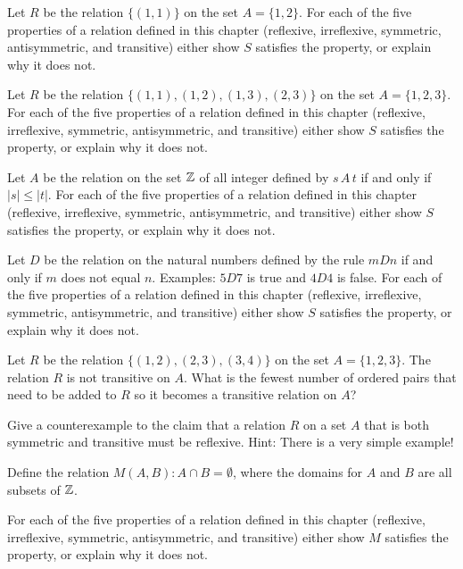 \begin{prob}
Let $R$  be the relation  $\{(1,1)\}$ on the set $A = \{ 1,2\}$. For each of the five properties of a relation defined in this chapter (reflexive, irreflexive, symmetric, antisymmetric, and transitive) 
either show $S$ satisfies the property, or explain why it does not.
\end{prob}

\begin{prob}
Let $R$  be the relation  $\{(1,1), (1,2), (1,3), (2,3)\}$ on the set $A = \{ 1,2,3\}$. For each of the five properties of a relation defined in this chapter (reflexive, irreflexive, symmetric, antisymmetric, and transitive) 
either show $S$ satisfies the property, or explain why it does not.
\end{prob}

\begin{prob}
Let $A$ be the relation on the set $\mathbb{Z}$ of all integer defined by $s\,A\,t$ if and only if $|s|\leq |t|$.  For each of the five properties of a relation defined in this chapter (reflexive, irreflexive, symmetric, antisymmetric, and transitive) either show $S$ satisfies the property, or explain why it does not.
\end{prob}


\begin{prob}
Let $D$ be the relation on the natural numbers defined by the rule $mDn$ if and only if $m$ does not equal $n$. Examples: $5D7$ is true and $4D4$
is false. For each of the five properties of a relation defined in this chapter (reflexive, irreflexive, symmetric, antisymmetric, and transitive) 
either show $S$ satisfies the property, or explain why it does not.
\end{prob}

\begin{prob}
Let $R$ be the relation  $\{(1,2), (2,3), (3,4)\}$ on the set $A=\{1,2,3\}$. The relation $R$ is not transitive on $A$. What is the fewest number of ordered 
pairs that need to be added to $R$ so it becomes a transitive relation on $A$?
\end{prob}

\begin{prob}
Give a counterexample to the claim that a relation $R$ on a set $A$ that is both symmetric and transitive must be reflexive. Hint: There is a very simple example!
\end{prob}

\begin{prob} 
Define the relation {\itshape $M(A,B) : A\cap B = \emptyset$}, where the
domains for $A$ and $B$ are all subsets of $\mathbb{Z}$. 

For each of the five properties of a relation defined in this chapter (reflexive, irreflexive, symmetric, antisymmetric, and transitive) 
either show $M$ satisfies the property, or explain why it does not.
\end{prob}


